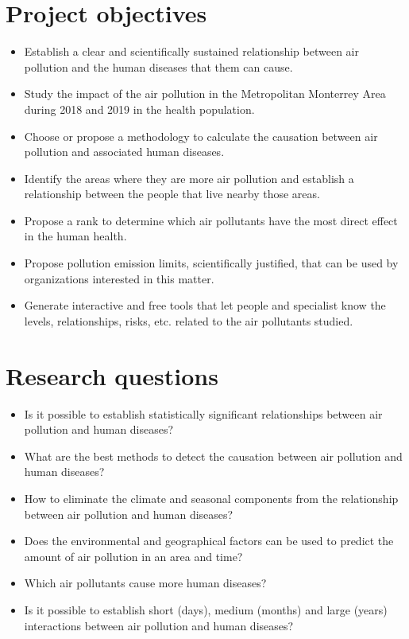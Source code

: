 \documentclass[
  11pt,
  a4paper,
  oneside
]{article}
\begin{document}
\section{Project objectives}
\begin{itemize}
    \setlength\itemsep{-0.5em}
    \item Establish a clear and scientifically sustained relationship between air pollution and the human diseases that them can cause.
    \item Study the impact of the air pollution in the Metropolitan Monterrey Area during  2018 and 2019 in the health population.
    \item Choose or propose a methodology to calculate the causation between air pollution and associated human diseases.
    \item Identify the areas where they are more air pollution and establish a relationship between the people that live nearby those areas.
    \item Propose a rank to determine which air pollutants have the most direct effect in the human health.
    \item Propose pollution emission limits, scientifically justified, that can be used by organizations interested in this matter.
    \item Generate interactive and free tools that let people and specialist know the levels, relationships, risks, etc. related to the air pollutants studied.
\end{itemize}

\section{Research questions}
\begin{itemize}
    \setlength\itemsep{-0.5em}
    \item Is it possible to establish statistically significant relationships between air pollution and human diseases?
    \item What are the best methods to detect the causation between air pollution and human diseases?
    \item How to eliminate the climate and seasonal components from the relationship between air pollution and human diseases?
    \item Does the environmental and geographical factors can be used to predict the 
    amount of air pollution in an area and time?
    \item Which air pollutants cause more human diseases?
    \item Is it possible to establish short (days), medium (months) and large (years) interactions between air pollution and human diseases?
\end{itemize}
\end{document}
